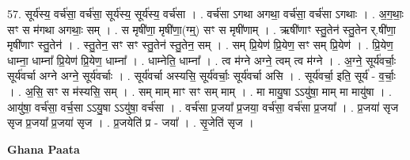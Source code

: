 \documentclass[17pt]{extarticle}
\begin{document}
57. सूर्य॑स्य॒ वर्च॑सा॒ वर्च॑सा॒ सूर्य॑स्य॒ सूर्य॑स्य॒ वर्च॑सा । . वर्च॑सा ऽगथा अगथा॒ वर्च॑सा॒ वर्च॑सा ऽगथाः । . अ॒ग॒थाः॒ सꣳ स म॑गथा अगथाः॒ सम् । . स मृषी॑णा॒ मृषी॑णा॒(ग्म्॒) सꣳ स मृषी॑णाम् । . ऋषी॑णाꣳ स्तु॒तेन॑ स्तु॒तेन र्.षी॑णा॒ मृषी॑णाꣳ स्तु॒तेन॑ । . स्तु॒तेन॒ सꣳ सꣳ स्तु॒तेन॑ स्तु॒तेन॒ सम् । . सम् प्रि॒येण॑ प्रि॒येण॒ सꣳ सम् प्रि॒येण॑ । . प्रि॒येण॒ धाम्ना॒ धाम्ना᳚ प्रि॒येण॑ प्रि॒येण॒ धाम्ना᳚ । . धाम्नेति॒ धाम्ना᳚ । . त्व म॑ग्ने अग्ने॒ त्वम् त्व म॑ग्ने । . अ॒ग्ने॒ सूर्य॑वर्चाः॒ सूर्य॑वर्चा अग्ने अग्ने॒ सूर्य॑वर्चाः । . सूर्य॑वर्चा अस्यसि॒ सूर्य॑वर्चाः॒ सूर्य॑वर्चा असि । . सूर्य॑वर्चा॒ इति॒ सूर्य॑ - व॒र्चाः॒ । . अ॒सि॒ सꣳ स म॑स्यसि॒ सम् । . सम् माम् माꣳ सꣳ सम् माम् । . मा मायु॒षा ऽऽयु॑षा॒ माम् मा मायु॑षा । . आयु॑षा॒ वर्च॑सा॒ वर्च॒सा ऽऽयु॒षा ऽऽयु॑षा॒ वर्च॑सा । . वर्च॑सा प्र॒जया᳚ प्र॒जया॒ वर्च॑सा॒ वर्च॑सा प्र॒जया᳚ । . प्र॒जया॑ सृज सृज प्र॒जया᳚ प्र॒जया॑ सृज । . प्र॒जयेति॑ प्र - जया᳚ । . सृ॒जेति॑ सृज । \newline

\textbf{Ghana Paata } \newline
\end{document}
